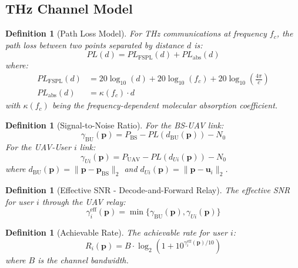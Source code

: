 \documentclass[11pt,a4paper]{article}
\newtheorem{definition}[theorem]{Definition}
\newcommand{\bp}{\mathbf{p}}
\newcommand{\bu}{\mathbf{u}}
\newcommand{\pbs}{\mathbf{p}_{\text{BS}}}
\begin{document}
\subsection{THz Channel Model}

\begin{definition}[Path Loss Model]
For THz communications at frequency $f_c$, the path loss between two points separated by distance $d$ is:
\begin{equation}
    PL(d) = PL_{\text{FSPL}}(d) + PL_{\text{abs}}(d)
\end{equation}
where:
\begin{align}
    PL_{\text{FSPL}}(d) &= 20\log_{10}(d) + 20\log_{10}(f_c) + 20\log_{10}\left(\frac{4\pi}{c}\right) \\
    PL_{\text{abs}}(d) &= \kappa(f_c) \cdot d
\end{align}
with $\kappa(f_c)$ being the frequency-dependent molecular absorption coefficient.
\end{definition}

\begin{definition}[Signal-to-Noise Ratio]
For the BS-UAV link:
\begin{equation}
    \gamma_{\text{BU}}(\bp) = P_{\text{BS}} - PL(d_{\text{BU}}(\bp)) - N_0
\end{equation}
For the UAV-User $i$ link:
\begin{equation}
    \gamma_{Ui}(\bp) = P_{\text{UAV}} - PL(d_{Ui}(\bp)) - N_0
\end{equation}
where $d_{\text{BU}}(\bp) = \|\bp - \pbs\|_2$ and $d_{Ui}(\bp) = \|\bp - \bu_i\|_2$.
\end{definition}

\begin{definition}[Effective SNR - Decode-and-Forward Relay]
The effective SNR for user $i$ through the UAV relay:
\begin{equation}
    \gamma_i^{\text{eff}}(\bp) = \min\{\gamma_{\text{BU}}(\bp), \gamma_{Ui}(\bp)\}
\end{equation}
\end{definition}

\begin{definition}[Achievable Rate]
The achievable rate for user $i$:
\begin{equation}
    R_i(\bp) = B \cdot \log_2\left(1 + 10^{\gamma_i^{\text{eff}}(\bp)/10}\right)
\end{equation}
where $B$ is the channel bandwidth.
\end{definition}
\end{document}
